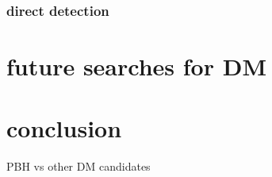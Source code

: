 \documentclass{article}
\begin{document}
\subsubsection{direct detection}
\section {future searches for DM}

\section {conclusion}
PBH vs other DM candidates 









\raggedright


\end{document}
